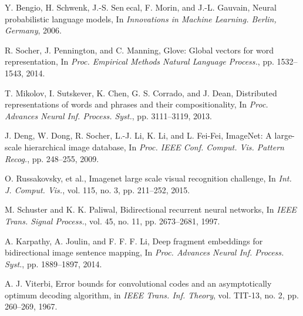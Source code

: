 \documentclass[10pt,twocolumn,letterpaper]{article}
\begin{document}
\begin{thebibliography}{99}
Y. Bengio, H. Schwenk, J.-S. Senecal, F. Morin, and J.-L. Gauvain, Neural probabilistic language models,
In \textit{Innovations in Machine Learning. Berlin, Germany}, 2006.

R. Socher, J. Pennington, and C. Manning, Glove: Global vectors for word representation,
In \textit{Proc. Empirical Methods Natural Language Process.}, pp. 1532–1543, 2014.

T. Mikolov, I. Sutskever, K. Chen, G. S. Corrado, and J. Dean, Distributed representations of words and phrases and their compositionality,
In \textit{Proc. Advances Neural Inf. Process. Syst.}, pp. 3111–3119, 2013.

J. Deng, W. Dong, R. Socher, L.-J. Li, K. Li, and L. Fei-Fei, ImageNet: A large-scale hierarchical image database,
In \textit{Proc. IEEE Conf. Comput. Vis. Pattern Recog.}, pp. 248–255, 2009.

O. Russakovsky, et al., Imagenet large scale visual recognition challenge,
In \textit{Int. J. Comput. Vis.}, vol. 115, no. 3, pp. 211–252, 2015.

M. Schuster and K. K. Paliwal, Bidirectional recurrent neural networks,
In \textit{IEEE Trans. Signal Process.}, vol. 45, no. 11, pp. 2673–2681, 1997.

A. Karpathy, A. Joulin, and F. F. F. Li, Deep fragment embeddings for bidirectional image sentence mapping,
In \textit{Proc. Advances Neural Inf. Process. Syst.}, pp. 1889–1897, 2014.

A. J. Viterbi, Error bounds for convolutional codes and an asymptotically optimum decoding algorithm,
in \textit{IEEE Trans. Inf. Theory}, vol. TIT-13, no. 2, pp. 260–269, 1967.

\end{thebibliography}
\end{document}
